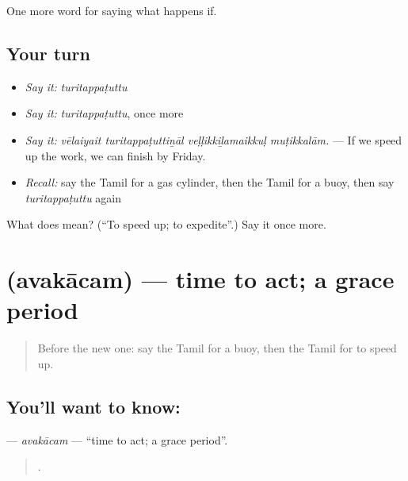\begin{grammarlens}[title={What you've built}]
One more word for saying what happens if.
\end{grammarlens}

\subsection*{Your turn}
\begin{itemize}
\raggedright
  \item \emph{Say it:} \emph{turitappaṭuttu}
  \item \emph{Say it:} \emph{turitappaṭuttu}, once more
  \item \emph{Say it:} \emph{vēlaiyait turitappaṭuttiṉāl veḷḷikkiḻamaikkuḷ muṭikkalām.} — If we speed up the work, we can finish by Friday.
  \item \emph{Recall:} say the Tamil for a gas cylinder, then the Tamil for a buoy, then say \emph{turitappaṭuttu} again
\end{itemize}

\begin{tcolorbox}[breakable,colback=teal!4,colframe=teal!35!black,title={Before you move on}]
What does  mean? (\textquotedblleft{}To speed up; to expedite\textquotedblright{}.) Say it once more.
\end{tcolorbox}
\section[\texorpdfstring{\ta{அவகாசம்} (avakācam)}{அவகாசம் (avakācam)}]{ (avakācam) — time to act; a grace period}

\label{lesson:TA-C552-avakacam}



\begin{quote}
Before the new one: say the Tamil for a buoy, then the Tamil for to speed up.
\end{quote}

\subsection*{You'll want to know: }
\textbf{} — \emph{avakācam} — \textquotedblleft{}time to act; a grace period\textquotedblright{}.

\begin{quote}
      .
\end{quote}

